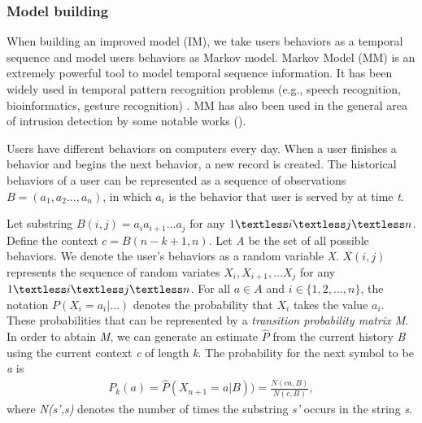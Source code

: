 \documentclass[conference]{IEEEtran}
\begin{document}
\subsubsection{Model building}

When building an improved model (IM), we take users behaviors as a temporal sequence and model users behaviors as Markov model.
Markov Model (MM) \cite{b21} is an extremely powerful
tool to model temporal sequence information. It has been
widely used in temporal pattern recognition problems (e.g.,
speech recognition, bioinformatics, gesture recognition) \cite{b23}. MM has also been used
in the general area of intrusion detection by some notable
works (\cite{b21}).

Users have different behaviors on computers every day. When a user finishes a behavior and begins the next behavior, a new record is created. 
The historical behaviors of a user can be represented as a sequence of observations \emph{$B=(a_1,a_2...,a_n)$}, in which \emph{$a_i$} is the behavior that user is served by at time \emph{t}. 

Let substring \emph{$B(i, j) = a_ia_{i+1}\ldots a_j$} for any \emph{$1 \textless i \textless j \textless n$}. Define the context \emph{$c = B(n-k+1,n)$}. Let \emph{A} be the set of all possible behaviors. 
We denote the user’s behaviors as a random variable \emph{X}. \emph{$X(i,j)$} represents the sequence of random variates \emph{$X_i, X_{i+1},\ldots X_j$} for any \emph{$1\textless i \textless j \textless n$}. 
For all \emph{$a \in A $} and \emph{$i \in \{1,2,. . ., n\}$}, the notation \emph{$P(X_i = a_i|\ldots)$} denotes the probability that \emph{$X_i$} takes the value \emph{$a_i$}.
These probabilities that can be represented by a \emph{transition
probability matrix M}. 
In order to abtain \emph{M}, we can generate an estimate \emph{$\hat P$} from the current history \emph{B} using the current context \emph{c} of length \emph{k}. The probability for the next symbol to be \emph{a} is
\begin{align}
    P_k(a)=\hat P(X_{n+1}=a|B))= \frac {N(ca,B)}{N(c,B)},
\end{align}
where \emph{N(s',s)} denotes the number of times the substring \emph{s'} occurs in the string \emph{s}.

\end{document}
